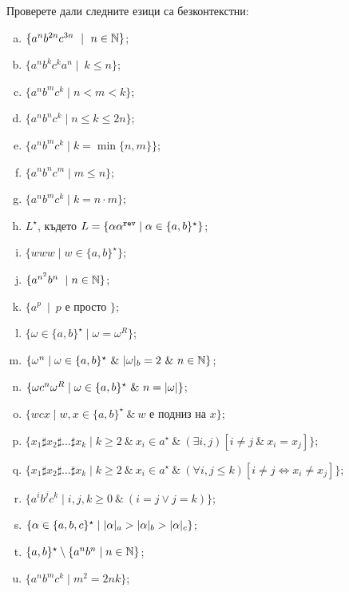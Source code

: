 \begin{problem}
  Проверете дали следните езици са безконтекстни:
  \begin{enumerate}[a)]
  \item
    $\{a^nb^{2n}c^{3n}\ \mid\ n\in\Nat\}$;
  \item
    $\{a^nb^kc^ka^n\mid\ k \leq n\}$;
  \item
    $\{a^nb^mc^k\mid n < m < k\}$;
  \item
    $\{a^nb^nc^k\mid n \leq k \leq 2n\}$;
  \item
    $\{a^nb^mc^k\mid k = \min\{n,m\}\}$;
  \item
    $\{a^nb^nc^m\mid m \leq n\}$;
  \item
    $\{a^nb^mc^k\mid k = n\cdot m\}$;
  \item
    $L^\star$, където
    $L = \{\alpha\alpha^{\texttt{rev}} \mid \alpha \in \{a,b\}^\star\}$;
  \item
    $\{www\mid w\in \{a,b\}^\star\}$;
  \item
    $\{a^{n^2}b^n\ \mid n \in \mathbb{N}\}$;
  \item
    $\{a^p\ \mid\ p\mbox{ е просто }\}$;
  \item
    $\{\omega \in \{a,b\}^\star \mid \omega = \omega^R\}$;
  \item
    $\{\omega^n \mid \omega \in \{a,b\}^\star\ \&\ \vert{\omega}\vert_{b} = 2\ \&\ n \in \mathbb{N}\}$;
  \item
    $\{\omega c^n \omega^R \mid \omega \in \{a,b\}^\star\ \&\ n = \vert{\omega}\vert\}$;
  \item
    $\{w c x\mid w,x\in \{a,b\}^\star\ \&\ w\mbox{ е подниз на }x\}$;
  \item
    $\{x_1 \sharp x_2 \sharp \dots \sharp x_k\mid k\geq 2\ \&\ x_i\in a^\star\ \&\ (\exists i,j)[i \neq j\ \&\ x_i = x_j]\}$;
  \item
    $\{x_1 \sharp x_2 \sharp \dots \sharp x_k\mid k\geq 2\ \&\ x_i\in a^\star\ \&\ (\forall i,j \leq k)[i \neq j \iff x_i \neq x_j]\}$;
  \item
    $\{a^ib^jc^k\mid i,j,k\geq 0\ \&\ (i = j \vee j = k)\}$;
  \item
    $\{\alpha \in \{a,b,c\}^\star\mid \vert{\alpha}\vert_{a} > \vert{\alpha}\vert_{b} > \vert{\alpha}\vert_{c}\}$;
  \item
    $\{a,b\}^\star \setminus \{a^nb^n\mid n\in \mathbb{N}\}$;
  \item
    $\{a^nb^mc^k \mid m^2 = 2nk\}$;


\end{enumerate}
\end{problem}
